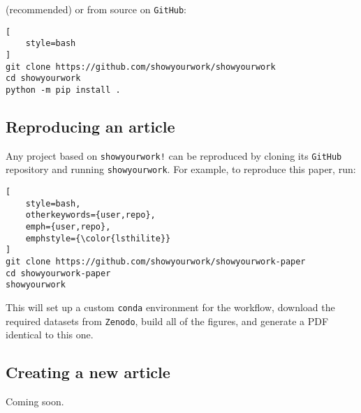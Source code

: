 \documentclass[modern]{aastex631}
\begin{document}
\noindent (recommended) or from source on \texttt{GitHub}:\\

\noindent\begin{minipage}{\linewidth}
\begin{lstlisting}[
    style=bash
]
git clone https://github.com/showyourwork/showyourwork
cd showyourwork
python -m pip install .
\end{lstlisting}
\end{minipage}

\subsection{Reproducing an article}
\label{sec:usage:reproduce}
Any project based on \texttt{showyourwork!} can be reproduced by cloning its \texttt{GitHub} repository and running \texttt{showyourwork}. For example, to reproduce this paper, run:\\

\noindent\begin{minipage}{\linewidth}
\begin{lstlisting}[
    style=bash,
    otherkeywords={user,repo},
    emph={user,repo},
    emphstyle={\color{lsthilite}}
]
git clone https://github.com/showyourwork/showyourwork-paper
cd showyourwork-paper
showyourwork
\end{lstlisting}
\end{minipage}

\noindent This will set up a custom \texttt{conda} environment for the workflow, download the required datasets from \texttt{Zenodo}, build all of the figures, and generate a PDF identical to this one.

\subsection{Creating a new article}
\label{sec:usage:new}
Coming soon.
\end{document}
